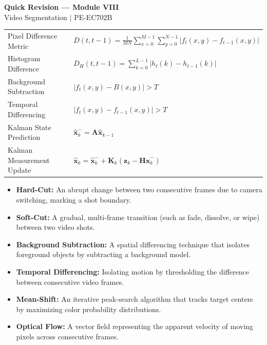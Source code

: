 \documentclass[12pt,a4paper]{article}
\renewcommand{\arraystretch}{1.45}
\begin{document}
\newpage

\begin{center}
  {\large\bfseries\color{myred} Quick Revision --- Module VIII}\\[3pt]
  {\small\color{mydark} Video Segmentation $|$ PE-EC702B}
\end{center}
\noindent{\color{myred}\rule{\linewidth}{1.2pt}}
\vspace{4pt}

\begin{tcolorbox}[formulabox, title={\textbf{Key Formulas at a Glance}}]
\renewcommand{\arraystretch}{1.3}
\begin{tabularx}{\linewidth}{B{5.0cm} X}Pixel Difference Metric & $D(t, t-1) = \frac{1}{MN} \sum_{x=0}^{M-1} \sum_{y=0}^{N-1} \left| f_t(x,y) - f_{t-1}(x,y) \right|$ \\
Histogram Difference & $D_H(t, t-1) = \sum_{k=0}^{L-1} \left| h_t(k) - h_{t-1}(k) \right|$ \\
Background Subtraction & $|f_t(x,y) - B(x,y)| > T$ \\
Temporal Differencing & $|f_t(x,y) - f_{t-1}(x,y)| > T$ \\
Kalman State Prediction & $\hat{\mathbf{x}}_k^- = \mathbf{A}\hat{\mathbf{x}}_{k-1}$ \\
Kalman Measurement Update & $\hat{\mathbf{x}}_k = \hat{\mathbf{x}}_k^- + \mathbf{K}_k(\mathbf{z}_k - \mathbf{H}\hat{\mathbf{x}}_k^-)$
\end{tabularx}
\end{tcolorbox}

\begin{tcolorbox}[defbox, title={\textbf{One-Line Definitions}}]
\begin{itemize}[leftmargin=*, itemsep=2.5pt, topsep=0pt]
  \item \textbf{Hard-Cut:} An abrupt change between two consecutive frames due to camera switching, marking a shot boundary.
  \item \textbf{Soft-Cut:} A gradual, multi-frame transition (such as fade, dissolve, or wipe) between two video shots.
  \item \textbf{Background Subtraction:} A spatial differencing technique that isolates foreground objects by subtracting a background model.
  \item \textbf{Temporal Differencing:} Isolating motion by thresholding the difference between consecutive video frames.
  \item \textbf{Mean-Shift:} An iterative peak-search algorithm that tracks target centers by maximizing color probability distributions.
  \item \textbf{Optical Flow:} A vector field representing the apparent velocity of moving pixels across consecutive frames.
\end{itemize}
\end{tcolorbox}
\end{document}

